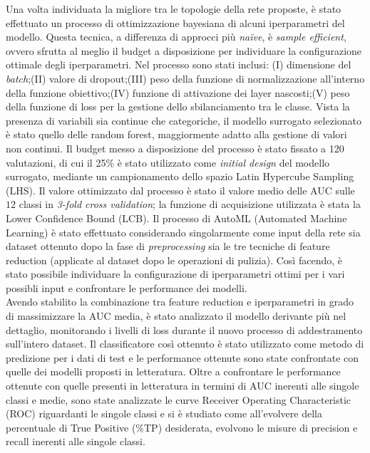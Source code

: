 Una volta individuata la migliore tra le topologie della rete proposte, è stato effettuato un processo di ottimizzazione bayesiana di alcuni iperparametri del modello. 
Questa tecnica, a differenza di approcci più \textit{na\"ive}, è \textit{sample efficient}, ovvero sfrutta al meglio il budget a disposizione per individuare la configurazione ottimale degli iperparametri. Nel processo sono stati inclusi: (I) dimensione del \textit{batch};(II) valore di dropout;(III) peso della funzione di normalizzazione all'interno della funzione obiettivo;(IV) funzione di attivazione dei layer nascosti;(V) peso della funzione di loss per la gestione dello sbilanciamento tra le classe.
Vista la presenza di variabili sia continue che categoriche, il modello surrogato selezionato è stato quello delle random forest, maggiormente adatto alla gestione di valori non continui. 
Il budget messo a disposizione del processo è stato fissato a 120 valutazioni, di cui il 25\% è stato utilizzato come \textit{initial design} del modello surrogato, mediante un campionamento dello spazio Latin Hypercube Sampling (LHS). Il valore ottimizzato dal processo è stato il valore medio delle AUC sulle $12$ classi in \textit{3-fold cross validation}; la funzione di acquisizione utilizzata è stata la Lower Confidence Bound (LCB).
Il processo di AutoML (Automated Machine Learning) è stato effettuato considerando singolarmente come input della rete sia dataset ottenuto dopo la fase di \textit{preprocessing} sia le tre tecniche di feature reduction (applicate al dataset dopo le operazioni di pulizia).
Così facendo, è stato possibile individuare la configurazione di iperparametri ottimi per i vari possibli input e confrontare le performance dei modelli.\\ 
Avendo stabilito la combinazione tra feature reduction e iperparametri in grado di massimizzare la AUC media, è stato analizzato il modello derivante più nel dettaglio, monitorando i livelli di loss durante il nuovo processo di addestramento sull'intero dataset.
Il classificatore così ottenuto è stato utilizzato come metodo di predizione per i dati di test e le performance ottenute sono state confrontate con quelle dei modelli proposti in letteratura.
Oltre a confrontare le performance ottenute con quelle presenti in letteratura in termini di AUC inerenti alle singole classi e medie, sono state analizzate le curve Receiver Operating Characteristic (ROC) riguardanti le singole classi e si è studiato come all'evolvere della percentuale di True Positive (\%TP) desiderata, evolvono le misure di precision e recall inerenti alle singole classi.
